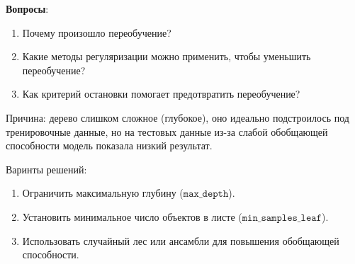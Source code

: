\textbf{Вопросы}:
\begin{enumerate}
    \item Почему произошло переобучение?
    \item Какие методы регуляризации можно применить, чтобы уменьшить переобучение?
    \item Как критерий остановки помогает предотвратить переобучение?
\end{enumerate}
\begin{solution}
    Причина: дерево слишком сложное (глубокое), оно идеально подстроилось под тренировочные данные, но на тестовых данные из-за слабой обобщающей способности модель показала низкий результат.
    
    Варинты решений:
    \begin{enumerate}
        \item Ограничить максимальную глубину (\(\texttt{max\_depth}\)).
        \item Установить минимальное число объектов в листе (\(\texttt{min\_samples\_leaf}\)).
        \item Использовать случайный лес или ансамбли для повышения обобщающей способности.
    \end{enumerate}
\end{solution}

